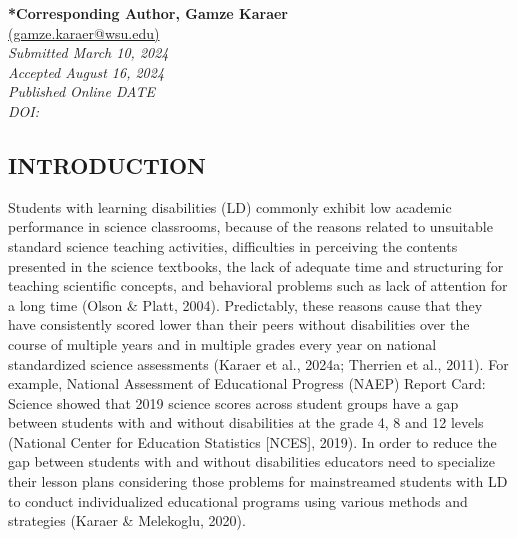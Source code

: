 \documentclass[11.5pt]{sig-alternate} %
\begin{document}

\textbf{*Corresponding Author, Gamze Karaer}\\ %
\href{mailto:gamze.karaer@wsu.edu}{(gamze.karaer@wsu.edu)} \\ %
\textit{Submitted March 10, 2024} \\ %
\textit{Accepted August 16, 2024} \\ %
\textit{Published Online DATE} \\ %
\textit{DOI: } \\ %
\pagebreak 
\clearpage %
\begin{large}
\section*{INTRODUCTION}
Students with learning disabilities (LD) commonly exhibit low academic performance in science classrooms, because of the reasons related to unsuitable standard science teaching activities, difficulties in perceiving the contents presented in the science textbooks, the lack of adequate time and structuring for teaching scientific concepts, and behavioral problems such as lack of attention for a long time (Olson \& Platt, 2004). Predictably, these reasons cause that they have consistently scored lower than their peers without disabilities over the course of multiple years and in multiple grades every year on national standardized science assessments (Karaer et al., 2024a; Therrien et al., 2011). For example, National Assessment of Educational Progress (NAEP) Report Card: Science showed that 2019 science scores across student groups have a gap between students with and without disabilities at the grade 4, 8 and 12 levels (National Center for Education Statistics [NCES], 2019). In order to reduce the gap between students with and without disabilities educators need to specialize their lesson plans considering those problems for mainstreamed students with LD to conduct individualized educational programs using various methods and strategies (Karaer \& Melekoglu, 2020). 


\end{large}
\end{document}
